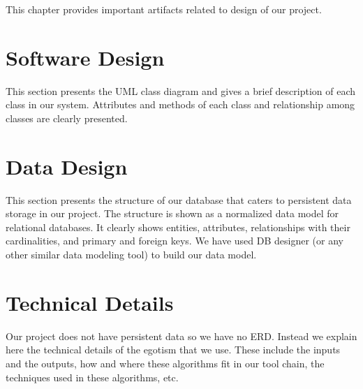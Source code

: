 
This chapter provides important artifacts related to design of our project.

\section{Software Design}

This section presents the UML class diagram and gives a brief description of each class in our system. Attributes and methods of each class and relationship among classes are clearly presented.


\section{Data Design}

This section presents the structure of our database that caters to persistent data storage in our project. The structure is shown as a normalized data model for relational databases. It clearly shows entities, attributes, relationships with their cardinalities, and primary and foreign keys. We have used DB designer (or any other similar data modeling tool) to build our data model.

 
\section{Technical Details}

Our project does not have persistent data so we have no ERD. Instead we explain here the technical details of the egotism that we use. These include the inputs and the outputs, how and where these algorithms fit in our tool chain, the techniques used in these algorithms, etc.